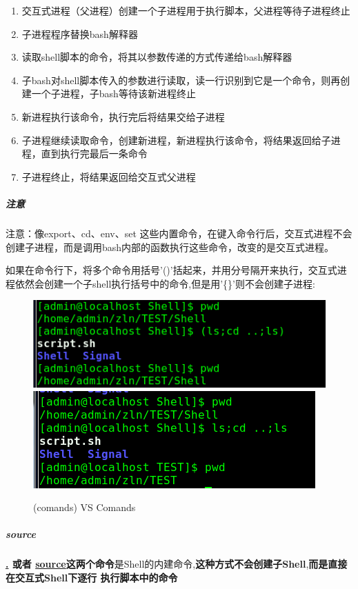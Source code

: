 \documentclass[UTF8,a4paper,12pt]{ctexbook}
\begin{document}
				 \begin{enumerate}
				 	\item 交互式进程（父进程）创建一个子进程用于执行脚本，父进程等待子进程终止
				 	\item 子进程程序替换bash解释器
				 	\item 读取shell脚本的命令，将其以参数传递的方式传递给bash解释器
				 	\item 子bash对shell脚本传入的参数进行读取，读一行识别到它是一个命令，则再创建一个子进程，子bash等待该新进程终止
				 	\item 新进程执行该命令，执行完后将结果交给子进程
				 	\item 子进程继续读取命令，创建新进程，新进程执行该命令，将结果返回给子进程，直到执行完最后一条命令
				 	\item 子进程终止，将结果返回给交互式父进程
				 \end{enumerate}
				 
				 \subparagraph{注意}注意：像export、cd、env、set 这些内置命令，在键入命令行后，交互式进程不会创建子进程，而是调用bash内部的函数执行这些命令，改变的是交互式进程。
				 
				 如果在命令行下，将多个命令用括号'()'括起来，并用分号隔开来执行，交互式进程依然会创建一个子shell执行括号中的命令,但是用'\{\}'则不会创建子进程:
					 \begin{figure}[h]
					 	\begin{center}
						 	\includegraphics[scale = 0.5]{figure/ShellBracket.png}
						 	\includegraphics[scale = 0.5]{figure/ShellBracketNo.png}
						\end{center}
					 	\caption{(comands) VS Comands}
					 \end{figure}
				 
				 \subparagraph{source}
				 	\textbf{\underline{.} 或者 \underline{source}这两个命令}是Shell的内建命令,\textbf{这种方式不会创建子Shell},\textbf{而是直接在交互式Shell下逐行 执行脚本中的命令}
				 
\end{document}
